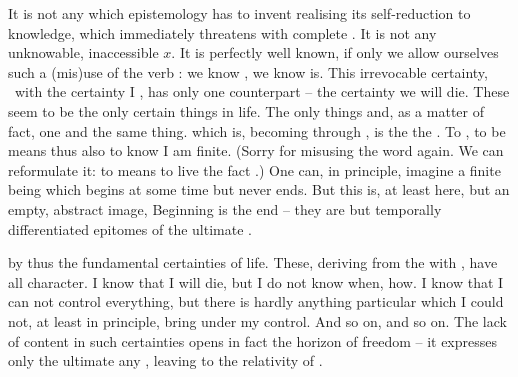 \pa It is not any  which epistemology has to invent
realising its self-reduction to  knowledge, which immediately
threatens with complete . It is not any unknowable,
inaccessible $x$. It is perfectly well known, if only we allow ourselves such a
(mis)use of the verb : we know , we know  is. This
irrevocable certainty, \equi\ with the certainty  I , has
only one counterpart -- the certainty  we will die.  These seem to be
the only  certain things in life. The only things and, as a matter
of fact, one and the same thing.  which is, becoming 
through , is the  the . To
, to be  means thus also to know  I am finite.
(Sorry for misusing the word  again. We can reformulate it: to
 means to live the fact .) One can, in
principle, imagine a finite being which begins at some time but never ends. But
this is, at least here, but an empty, abstract image,  Beginning is the end -- they are but temporally
differentiated
epitomes %
of the ultimate .

 by   thus the fundamental certainties of
life. These, 
deriving from the  with , have all
 character. I know that I will die, but I do not know when, how. I
know that I can not control everything, but there is hardly anything particular
which I could not, at least in principle, bring under my control. And so on, and
so on.  The lack of  content in such certainties opens in fact the
horizon of  freedom -- it expresses only the ultimate 
 any , leaving  to the  relativity of
.


